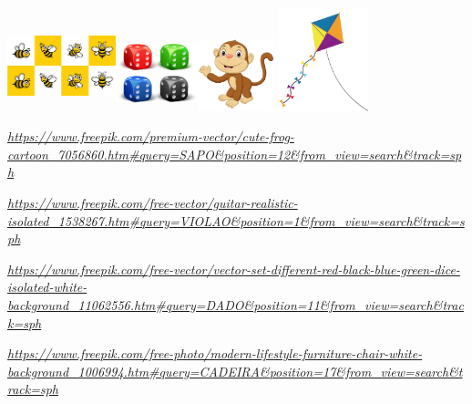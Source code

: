 \includegraphics[width=1.23958in,height=1.03019in]{media/image13.png}\includegraphics[width=0.93333in,height=0.87447in]{media/image14.png}\includegraphics[width=0.88403in,height=0.83253in]{media/image15.png}\includegraphics[width=1.11736in,height=1.18440in]{media/image16.png}

\href{https://www.freepik.com/premium-vector/cute-frog-cartoon_7056860.htm\#query=SAPO\&position=12\&from_view=search\&track=sph}{\emph{https://www.freepik.com/premium-vector/cute-frog-cartoon\_7056860.htm\#query=SAPO\&position=12\&from\_view=search\&track=sph}}

\href{https://www.freepik.com/free-vector/guitar-realistic-isolated_1538267.htm\#query=VIOLAO\&position=1\&from_view=search\&track=sph}{\emph{https://www.freepik.com/free-vector/guitar-realistic-isolated\_1538267.htm\#query=VIOLAO\&position=1\&from\_view=search\&track=sph}}

\href{https://www.freepik.com/free-vector/vector-set-different-red-black-blue-green-dice-isolated-white-background_11062556.htm\#query=DADO\&position=11\&from_view=search\&track=sph}{\emph{https://www.freepik.com/free-vector/vector-set-different-red-black-blue-green-dice-isolated-white-background\_11062556.htm\#query=DADO\&position=11\&from\_view=search\&track=sph}}

\href{https://www.freepik.com/free-photo/modern-lifestyle-furniture-chair-white-background_1006994.htm\#query=CADEIRA\&position=17\&from_view=search\&track=sph}{\emph{https://www.freepik.com/free-photo/modern-lifestyle-furniture-chair-white-background\_1006994.htm\#query=CADEIRA\&position=17\&from\_view=search\&track=sph}}

